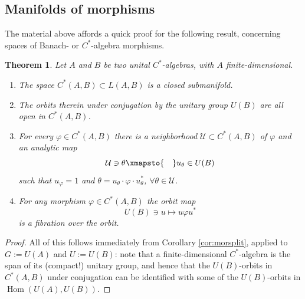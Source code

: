 \documentclass[pdftex]{sigma}
\numberwithin{equation}{section}
\newtheorem{Theorem}{Theorem}[section]
\newcommand\cU{{\mathcal U}}
\DeclareMathOperator{\Hom}{\mathrm{Hom}}
\begin{document}
\subsection{Manifolds of morphisms}\label{subse:manmor}

The material above affords a quick proof for the following result, concerning spaces of Banach- or $C^*$-algebra morphisms.


\begin{Theorem}\label{th:castmorcross}
 Let $A$ and $B$ be two unital $C^*$-algebras, with $A$ finite-dimensional.
 \begin{enumerate}[$(1)$]\itemsep=0pt
 \item The space $C^*(A,B)\subset L(A,B)$ is a closed submanifold.
 \item\label{item:a2brefreport} The orbits therein under conjugation by the unitary group $U(B)$ are all open in $C^*(A,B)$.
 \item\label{item:castcross} For every $\varphi\in C^*(A,B)$ there is a neighborhood $\cU\subset C^*(A,B)$ of $\varphi$ and an analytic map
 \begin{equation*}
 \cU\ni \theta\xmapsto{\quad}u_{\theta}\in U(B)
 \end{equation*}
 such that $u_{\varphi}=1$ and $\theta = u_{\theta}\cdot \varphi\cdot u_{\theta}^*$, $\forall \theta\in \cU$.
 \item For any morphism $\varphi\in C^*(A,B)$ the orbit map
 \[U(B)\ni u\mapsto u\varphi u^*\] is a fibration over the orbit.



 \end{enumerate}
\end{Theorem}
\begin{proof}
 All of this follows immediately from Corollary \ref{cor:morsplit}, applied to $G:=U(A)$ and $U:=U(B)$: note that a finite-dimensional $C^*$-algebra is the span of its (compact!) unitary group, and hence that the $U(B)$-orbits in $C^*(A,B)$ under conjugation can be identified with some of the $U(B)$-orbits in $\Hom(U(A), U(B))$.
\end{proof}
\end{document}
